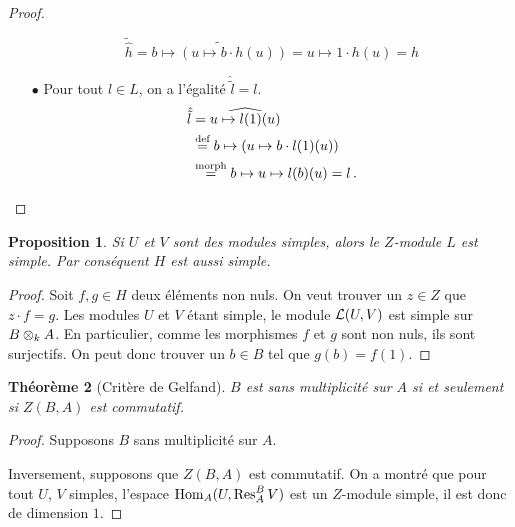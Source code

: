 \documentclass[francais,a4paper,11pt,reqno]{amsart}
\theoremstyle{plain}
\newtheorem{THEO}{\bf Théorème}[section]
\newtheorem{PROP}[THEO]{\bf Proposition}
\theoremstyle{definition}
\theoremstyle{remark}
\newcommand{\act}{\cdot}
\newcommand\eqcom[1]{\mathrel{\overset{\text{#1}}{=}}}
\begin{document}
\begin{proof}
\begin{itemize}
    \begin{equation}
      \tilde{\hat{h}} = \widetilde{b \mapsto (u \mapsto b\act h(u))}
      = u \mapsto 1\act h(u) = h
    \end{equation}
  \item[$\bullet$] Pour tout $l\in L$, on a l'égalité $\hat{\tilde{l}} = l$.
    \begin{align}
      \hat{\tilde{l}} &= \widehat{u \mapsto l(1)(u)}\\
      &\eqcom{def}b \mapsto (u \mapsto b\act l(1)(u)) \\
      &\eqcom{morph}b \mapsto u \mapsto l(b)(u) = l\,.\qedhere
    \end{align}
  \end{itemize}
\end{proof}

\begin{PROP}
  Si $U$ et $V$ sont des modules simples, alors le $Z$-module $L$ est
  simple. Par conséquent $H$ est aussi simple.
\end{PROP}
\begin{proof}
  Soit $f,g\in H$ deux éléments non nuls. On veut trouver un $z\in Z$ que
  $z\act f = g$. Les modules $U$ et $V$ étant simple, le module $\operatorname{\mathcal L}(U,V)$
  est simple sur $B\otimes_k A$. En particulier, comme les morphismes $f$ et
  $g$ sont non nuls, ils sont surjectifs. On peut donc trouver un $b\in B$ tel
  que $g(b) = f(1)$. 
\end{proof}
\begin{THEO}[Critère de Gelfand]
  $B$ est sans multiplicité sur $A$ si et seulement si $Z(B, A)$ est
  commutatif.
\end{THEO}
\begin{proof}
  Supposons $B$ sans multiplicité sur $A$. \TODO{}
  
  Inversement, supposons que $Z(B, A)$ est commutatif. On a montré que pour
  tout $U$, $V$ simples, l'espace $\operatorname{Hom}_A(U, \operatorname{Res}^B_A V)$ est un $Z$-module
  simple, il est donc de dimension $1$.
\end{proof}
\end{document}
